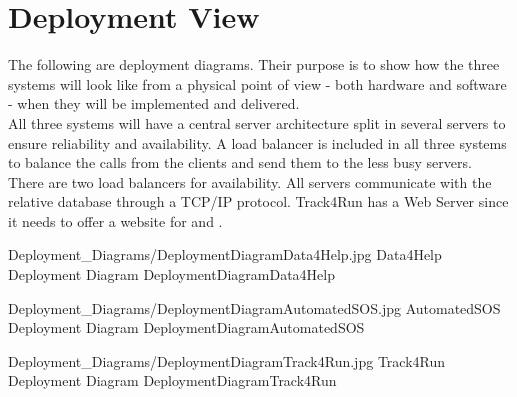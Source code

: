 \documentclass[../../DD.tex]{subfiles}
\begin{document}
\section{Deployment View}
	
	\indent The following are deployment diagrams. Their purpose is to show how the three systems will look like from a physical point of view - both hardware and software - when they will be implemented and delivered.\\
	\indent All three systems will have a central server architecture split in several servers to ensure reliability and availability. A load balancer is included in all three systems to balance the calls from the clients and send them to the less busy servers. There are two load balancers for availability. All servers communicate with the relative database through a TCP/IP protocol. Track4Run has a Web Server since it needs to offer a website for  and .

	\image {13cm} {Deployment_Diagrams/DeploymentDiagramData4Help.jpg} {Data4Help Deployment Diagram} {DeploymentDiagramData4Help}

	\image {13cm} {Deployment_Diagrams/DeploymentDiagramAutomatedSOS.jpg} {AutomatedSOS Deployment Diagram} {DeploymentDiagramAutomatedSOS}

	\image {13cm} {Deployment_Diagrams/DeploymentDiagramTrack4Run.jpg} {Track4Run Deployment Diagram} {DeploymentDiagramTrack4Run}
	
\end{document}
